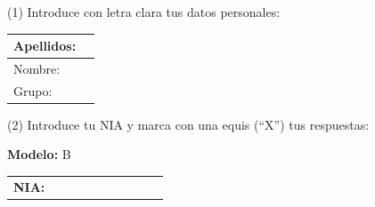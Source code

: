 \documentclass[a4paper,11pt]{article}
\begin{document}


\begin{center}
(1) Introduce con letra clara tus datos personales:
\end{center}

\begin{center}
\large

\begin{tabular}{|l|p{12cm}|}
\hline
Apellidos:   &  \\
\hline
Nombre: &    \\
\hline
Grupo:   &  \\
\hline
\end{tabular}
\end{center}


\begin{center}
(2) Introduce tu NIA y marca con una equis (``X'') tus respuestas:
\end{center}

\vspace{-0.4cm}

\begin{center}
\large
\textbf{Modelo:} B
\end{center}

\vspace{-0.4cm}

\begin{center}
\huge
\begin{tabular}{l|p{0.5cm}|p{0.5cm}|p{0.5cm}|p{0.5cm}|p{0.5cm}|p{0.5cm}|p{0.5cm}|p{0.5cm}|p{0.5cm}|}
\cline{2-10}
\textbf{NIA:} & & & & & & & & & \\
\cline{2-10}
\end{tabular}
\end{center}

\vspace{-0.4cm}
\end{document}
